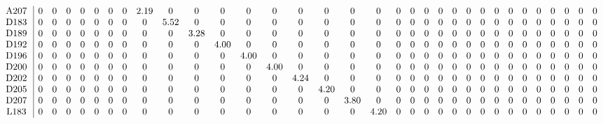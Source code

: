 \begin{table}[H]
\begin{center}
\begin{math}
\begin{array}{c|cccccccccccccccccccccccccccccccc}
\mathrm{A207} \hspace*{2pt} &  0 &  0 &  0 &  0 &  0 &  0 &  0 &       2.19 &  0 &  0 &  0 &  0 &  0 &  0 &  0 &  0 &  0 &  0 &  0 &  0 &  0 &  0 &  0 &  0 &  0 &  0 &  0 &  0 &  0 &  0 &  0 &  0 \\
\mathrm{D183} \hspace*{2pt} &  0 &  0 &  0 &  0 &  0 &  0 &  0 &  0 &       5.52 &  0 &  0 &  0 &  0 &  0 &  0 &  0 &  0 &  0 &  0 &  0 &  0 &  0 &  0 &  0 &  0 &  0 &  0 &  0 &  0 &  0 &  0 &  0 \\
\mathrm{D189} \hspace*{2pt} &  0 &  0 &  0 &  0 &  0 &  0 &  0 &  0 &  0 &       3.28 &  0 &  0 &  0 &  0 &  0 &  0 &  0 &  0 &  0 &  0 &  0 &  0 &  0 &  0 &  0 &  0 &  0 &  0 &  0 &  0 &  0 &  0 \\
\mathrm{D192} \hspace*{2pt} &  0 &  0 &  0 &  0 &  0 &  0 &  0 &  0 &  0 &  0 &       4.00 &  0 &  0 &  0 &  0 &  0 &  0 &  0 &  0 &  0 &  0 &  0 &  0 &  0 &  0 &  0 &  0 &  0 &  0 &  0 &  0 &  0 \\
\mathrm{D196} \hspace*{2pt} &  0 &  0 &  0 &  0 &  0 &  0 &  0 &  0 &  0 &  0 &  0 &       4.00 &  0 &  0 &  0 &  0 &  0 &  0 &  0 &  0 &  0 &  0 &  0 &  0 &  0 &  0 &  0 &  0 &  0 &  0 &  0 &  0 \\
\mathrm{D200} \hspace*{2pt} &  0 &  0 &  0 &  0 &  0 &  0 &  0 &  0 &  0 &  0 &  0 &  0 &       4.00 &  0 &  0 &  0 &  0 &  0 &  0 &  0 &  0 &  0 &  0 &  0 &  0 &  0 &  0 &  0 &  0 &  0 &  0 &  0 \\
\mathrm{D202} \hspace*{2pt} &  0 &  0 &  0 &  0 &  0 &  0 &  0 &  0 &  0 &  0 &  0 &  0 &  0 &       4.24 &  0 &  0 &  0 &  0 &  0 &  0 &  0 &  0 &  0 &  0 &  0 &  0 &  0 &  0 &  0 &  0 &  0 &  0 \\
\mathrm{D205} \hspace*{2pt} &  0 &  0 &  0 &  0 &  0 &  0 &  0 &  0 &  0 &  0 &  0 &  0 &  0 &  0 &       4.20 &  0 &  0 &  0 &  0 &  0 &  0 &  0 &  0 &  0 &  0 &  0 &  0 &  0 &  0 &  0 &  0 &  0 \\
\mathrm{D207} \hspace*{2pt} &  0 &  0 &  0 &  0 &  0 &  0 &  0 &  0 &  0 &  0 &  0 &  0 &  0 &  0 &  0 &       3.80 &  0 &  0 &  0 &  0 &  0 &  0 &  0 &  0 &  0 &  0 &  0 &  0 &  0 &  0 &  0 &  0 \\
\mathrm{L183} \hspace*{2pt} &  0 &  0 &  0 &  0 &  0 &  0 &  0 &  0 &  0 &  0 &  0 &  0 &  0 &  0 &  0 &  0 &       4.20 &  0 &  0 &  0 &  0 &  0 &  0 &  0 &  0 &  0 &  0 &  0 &  0 &  0 &  0 &  0 \\

\end{array}
\end{math}
\end{center}
\end{table}
